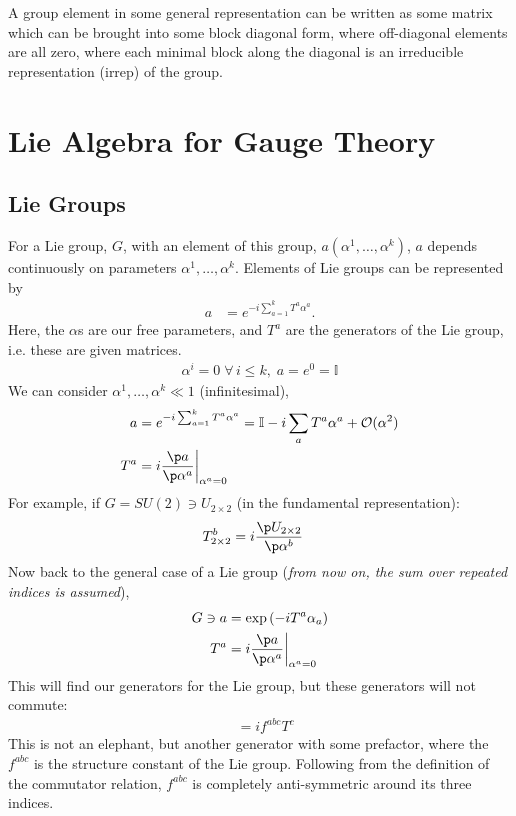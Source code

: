 \documentclass[a4paper, 11pt, normalem]{report}
\begin{document}
A group element in some general representation can be written as some matrix which can be brought into some block diagonal form, where off-diagonal elements are all zero, where each minimal block along the diagonal is an irreducible representation (irrep) of the group.

\chapter{Lie Algebra for Gauge Theory}
\section{Lie Groups}
For a Lie group, $G$, with an element of this group, $a(\alpha^1,\dots,\alpha^k)$, $a$ depends continuously on parameters $\alpha^1,\dots,\alpha^k$.
Elements of Lie groups can be represented by
\begin{align}
    a &= e^{-i\sum_{a=1}^k T^a\alpha^a}.
\end{align}
Here, the $\alpha$s are our free parameters, and $T^a$ are the generators of the Lie group, i.e. these are given matrices.
\begin{align}
    \alpha^i=0\; \forall\, i \leq k,\; a = e^0 = \mathbb{I}
\end{align}
We can consider $\alpha^1,\dots,\alpha^k\ll1$ (infinitesimal),
\begin{align}
    a &= e^{-i\sum_{a=1}^k T^a\alpha^a} = \mathbb{I} - i\sum_a T^a\alpha^a + \mathcal{O}(\alpha^2) \\
    T^a &= i\frac{\p a}{\p\alpha^a}\bigg|_{\alpha^a=0}
\end{align}
For example, if $G=SU(2)\ni U_{2\times2}$ (in the fundamental representation):
\begin{align}
    T^b_{2\times2} &= i\frac{\p U_{2\times2}}{\p\alpha^b}
\end{align}
Now back to the general case of a Lie group (\textit{from now on, the sum over repeated indices is assumed}),
\begin{align}
    G \ni a &= \exp\left(-iT^a\alpha_a\right) \\
    T^a &= i\frac{\p a}{\p\alpha^a}\bigg|_{\alpha^a=0}
\end{align}
This will find our generators for the Lie group, but these generators will not commute:
\begin{align}
    [T^a,T^b] &= if^{abc}T^c
\end{align}
This is not an elephant, but another generator with some prefactor, where the $f^{abc}$ is the structure constant of the Lie group.
Following from the definition of the commutator relation, $f^{abc}$ is completely anti-symmetric around its three indices.
\end{document}
